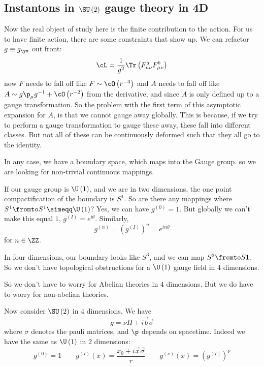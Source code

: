 \documentclass{booc}
\begin{document}
\subsection{Instantons in $\SU\left( 2 \right)$ gauge theory in 4D}

Now the real object of study here is the finite contribution to the action. 
For us to have finite action, there are some constraints that show up.
We can refactor $g \equiv g_\ym$ out front:
\begin{equation}
\cL = \frac{1}{g^2} \Tr\left( F_{\mu\nu}^a F_{\mu\nu}^b \right)
\end{equation}
now $F$ needs to fall off like $F\sim \cO\left( r^{-3} \right)$
and $A$ needs to fall off like
$A\sim g\p_\mu g^{-1} + \cO\left( r^{-2} \right)$
from the derivative, and since $A$ is only defined up to a gauge transformation.
So the problem with the first term of this asymptotic expansion for $A$, 
is that we cannot gauge away globally.
This is because, if we try to perform a gauge transformation to gauge these away, 
these fall into different classes. 
But not all of these can be continuously deformed such that they all go to the identity.

In any case, we have a boundary space, which maps into the Gauge group. 
so we are looking for non-trivial continuous mappings. 

\begin{exm}
If our gauge group is $\U\left( 1 \right)$, and we are in two dimensions, 
the one point compactification of the boundary is $S^1$.
So are there any mappings where $S^1 \fromto S^1 \simeqq \U\left( 1 \right)$?
Yes, we can have $g^{\left( 0 \right)} = 1$. 
But globally we can't make this equal $1$, $g^{\left( I \right)} = e^{i\theta}$.
Similarly, 
\begin{equation}
g^{\left( n \right)} = \left( g^{\left( I \right)} \right)^n = e^{in\theta}
\end{equation}
for $n\in \ZZ$. 
\end{exm}

\begin{exm}
In four dimensions, our boundary looks like $S^3$, 
and we can map $S^3 \fromto S1$.
So we don't have topological obstructions for a $\U\left( 1 \right)$ gauge field in $4$ dimensions.
\end{exm}

So we don't have to worry for Abelian theories in $4$ dimensions. 
But we do have  to worry for non-abelian theories.

\begin{exm}
Now consider $\SU\left( 2 \right)$ in $4$ dimensions. 
We have
\begin{equation}
g = \nu \Pi + i \vec{b}\vec{\sigma}
\end{equation}
where $\sigma$ denotes the  pauli matrices, and $\p$ depends on spacetime. 
Indeed we have the same as $\U\left( 1 \right)$ in $2$ dimensions:
\begin{equation}
g^{\left( 0 \right)} = 1
\qquad
g^{\left( I \right)} \left( x \right) = 
\frac{x_0 + i \vec{x} \vec{\sigma}}{r}
\qquad
g^{\left( \nu \right)} \left( x \right) = \left( g^{\left( I \right)} \right)^{\nu}
\end{equation}
\end{exm}
\end{document}
